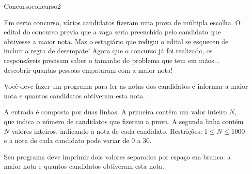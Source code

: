 \documentclass[12pt,a4paper,oneside]{article}
\begin{document}
\begin{problem}{Concurso}{concurso}{2}
 
Em certo concurso, vários candidatos fizeram uma prova de múltipla escolha. O edital do concurso previa que a vaga seria preenchida pelo candidato que obtivesse a maior nota. Mas o estagiário que redigiu o edital se esqueceu de incluir a regra de desempate! Agora que o concurso já foi realizado, os responsáveis precisam saber o tamanho do problema que tem em mãos... descobrir quantas pessoas empataram com a maior nota!

Você deve fazer um programa para ler as notas dos candidatos e informar a maior nota e quantos candidatos obtiveram esta nota.

%

\InputFile

A entrada é composta por duas linhas. A primeira contém um valor inteiro $N$, que indica o número de candidatos que fizeram a prova. A segunda linha contém $N$ valores inteiros, indicando a nota de cada
candidato. Restrições: $1 \leq N \leq 1000$ e a nota de cada candidato pode variar de $0$ a $30$.

\OutputFile

Seu programa deve imprimir dois valores separados por espaço em branco: a maior nota e quantos candidatos obtiveram esta nota.


\Example

\begin{example}
%
\end{example}

\begin{example}
%
\end{example}

\begin{example}
%
\end{example}



\end{problem}
\end{document}
